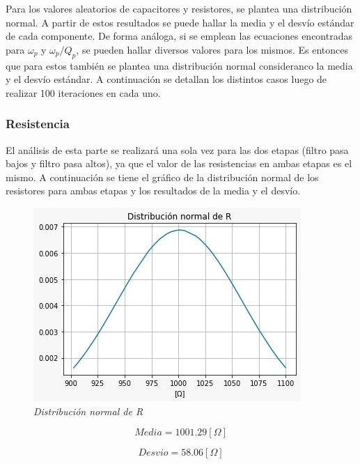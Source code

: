 \documentclass[12pt,A4paper,titlepage]{article}
\begin{document}
\bigskip
\hspace{1mm} Para los valores aleatorios de capacitores y resistores, se plantea una distribución normal. A partir de estos resultados se puede hallar la media y el desvío estándar de cada componente. De forma análoga, si se emplean las ecuaciones encontradas para \(\omega_p\) y \(\omega_p/Q_p\), se pueden hallar diversos valores para los mismos. Es entonces que para estos también se plantea una distribución normal consideranco la media y el desvío estándar. A continuación se detallan los distintos casos luego de realizar 100 iteraciones en cada uno. 

\subsubsection{Resistencia}

\hspace{1mm} El análisis de esta parte se realizará una sola vez para las dos etapas (filtro pasa bajos y filtro pasa altos), ya que el valor de las resistencias en ambas etapas es el mismo. A continuación se tiene el gráfico de la distribución normal de los resistores para ambas etapas y los resultados de la media y el desvío.

\begin{figure}[!h] 
  \centering
  \includegraphics[scale=0.55]{Imagenes/Distribución normal de R.png}
  \caption{\textit{Distribución normal de R}}
\end{figure}

\begin{equation}
    \boxed{Media = 1001.29 [\Omega]}     
\end{equation}

\begin{equation}
    \boxed{Desvio = 58.06 [\Omega]}
\end{equation}
\end{document}

